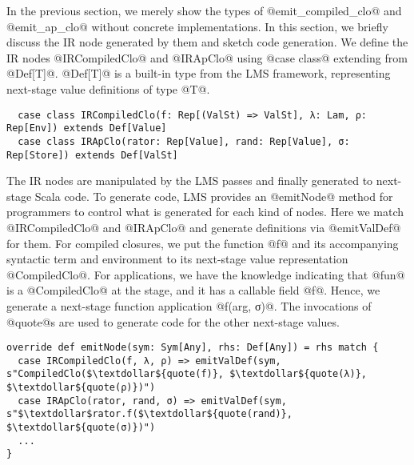 In the previous section, we merely show the types of @emit_compiled_clo@ and
@emit_ap_clo@ without concrete implementations. In this section, we briefly
discuss the IR node generated by them and sketch code generation.
We define the IR nodes @IRCompiledClo@ and @IRApClo@ using @case class@
extending from @Def[T]@. @Def[T]@ is a built-in type from the LMS framework,
representing next-stage value definitions of type @T@.
\begin{lstlisting}
  case class IRCompiledClo(f: Rep[(ValSt) => ValSt], λ: Lam, ρ: Rep[Env]) extends Def[Value]
  case class IRApClo(rator: Rep[Value], rand: Rep[Value], σ: Rep[Store]) extends Def[ValSt]
\end{lstlisting}

The IR nodes are manipulated by the LMS passes and finally generated to
next-stage Scala code. To generate code, LMS provides an @emitNode@ method for
programmers to control what is generated for each kind of nodes. Here we match
@IRCompiledClo@ and @IRApClo@ and generate definitions via @emitValDef@ for
them.  For compiled closures, we put the function @f@ and its accompanying
syntactic term and environment to its next-stage value representation
@CompiledClo@. For applications, we have the knowledge indicating that @fun@ is
a @CompiledClo@ at the stage, and it has a callable field @f@. Hence, we
generate a next-stage function application @f(arg, σ)@. The invocations of
@quote@s are used to generate code for the other next-stage values.
\begin{lstlisting}
override def emitNode(sym: Sym[Any], rhs: Def[Any]) = rhs match {
  case IRCompiledClo(f, λ, ρ) => emitValDef(sym, s"CompiledClo($\textdollar${quote(f)}, $\textdollar${quote(λ)}, $\textdollar${quote(ρ)})")
  case IRApClo(rator, rand, σ) => emitValDef(sym, s"$\textdollar$rator.f($\textdollar${quote(rand)}, $\textdollar${quote(σ)})")
  ...
}
\end{lstlisting}
